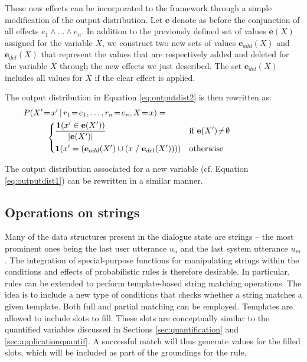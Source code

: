 These new effects can be incorporated to the framework through a simple modification of the output distribution. Let $\mathbf{e}$ denote as before the conjunction of all effects $e_1 \land \dots \land e_n$. In addition to the previously defined set of values $\mathbf{e}(X)$ assigned for the variable $X$, we construct two new sets of values $\mathbf{e}_{add}(X)$ and $\mathbf{e}_{del}(X)$ that represent the values that are respectively added and deleted for the variable $X$ through the new effects we just described. The set $\mathbf{e}_{del}(X)$ includes all values for $X$ if the clear effect is applied. 

The output distribution in Equation \eqref{eq:outputdist2} is then rewritten as:
\begin{align}
&P(X'\!=\!x' \, | \, r_1\!=\!e_1, \dots, r_n\!=\!e_n, X\!=\!x) = \hspace{5cm} \nonumber \\ & \; \; \; \; \; \; \; \; \; \;  \begin{dcases} 
\frac{ \mathbf{1}(x' \in {\mathbf{e}(X')})} { |\mathbf{e}(X')| }  & \text{if } \mathbf{e}(X')\!\neq\!\emptyset \\
\mathbf{1}(x' = \left(\mathbf{e}_{add}(X') \cup \left(x \; / \; \mathbf{e}_{del}(X')\right)\right)) & \text{otherwise} \\
\end{dcases}\label{eq:outputdist4}
\end{align} 

The output distribution associated for a new variable (cf. Equation \eqref{eq:outputdist1}) can be rewritten in a similar manner.




\subsection{Operations on strings}

Many of the data structures present in the dialogue state are strings -- the most prominent ones being the last user utterance $u_u$ and the last system utterance $u_m$. The integration of special-purpose functions for manipulating strings within the conditions and effects of probabilistic rules is therefore desirable. In particular, rules can be extended to perform template-based string matching operations.  The idea is to include a new type of conditions that checks whether a string matches a given template.  Both full and partial matching can be employed. Templates are allowed to include slots to fill. These slots are conceptually similar to the quantified variables discussed in Sections \ref{sec:quantification} and \ref{sec:applicationquantif}. A successful match will thus generate values for the filled slots, which will be included as part of the groundings for the rule. 

